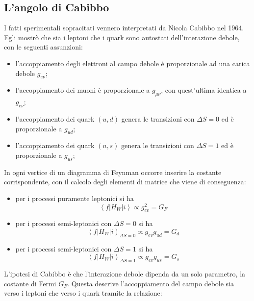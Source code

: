 \documentclass{subnucbo}
\begin{document}
\subsection{L'angolo di Cabibbo}
I fatti sperimentali sopracitati vennero interpretati da Nicola Cabibbo nel 1964. Egli mostrò che sia i leptoni che i quark sono autostati dell'interazione debole, con le seguenti assunzioni:
\begin{itemize}
        \item l'accoppiamento degli elettroni al campo debole è proporzionale ad una carica debole $g_{e\nu}$;
        \item l'accoppiamento dei muoni è proporzionale a $g_{\mu\nu}$, con quest'ultima identica a $g_{e\nu}$;
        \item l'accoppiamento dei quark $(u, d)$ genera le transizioni con $\Delta S = 0$ ed è proporzionale a $g_{ud}$;
        \item l'accoppiamento dei quark $(u, s)$ genera le transizioni con $\Delta S = 1$ ed è proporzionale a $g_{us}$;
\end{itemize}
In ogni vertice di un diagramma di Feynman occorre inserire la costante corrispondente, con il calcolo degli elementi di matrice che viene di conseguenza:
\begin{itemize}
        \item per i processi puramente leptonici si ha
                \begin{equation}
                        \left\langle f \left| H _ { W } \right| i \right\rangle \propto g _ { e v } ^ { 2 } = G _ { F }
                        \label{eq:genu}
                \end{equation}
        \item per i processi semi-leptonici con $\Delta S = 0$ si ha
                \begin{equation}
                \left\langle f \left| H _ { W } \right| i \right) _ { \Delta S = 0 } \propto g _ { e v } g _ { u d } = G _ { d }
                \label{eq:gd}
        \end{equation}
\item per i processi semi-leptonici con $\Delta S = 1$ si ha
        \begin{equation}
                \left\langle f \left| H _ { W } \right| i \right\rangle _ { \Delta S = 1 } \propto g _ { e v } g _ { u s } = G _ { s }
                \label{eq:gs}
        \end{equation}
\end{itemize}
L'ipotesi di Cabibbo è che l'interazione debole dipenda da un solo parametro, la costante di Fermi $G_{F}$. Questa descrive l'accoppiamento del campo debole sia verso i leptoni che verso i quark tramite la relazione:
\end{document}
